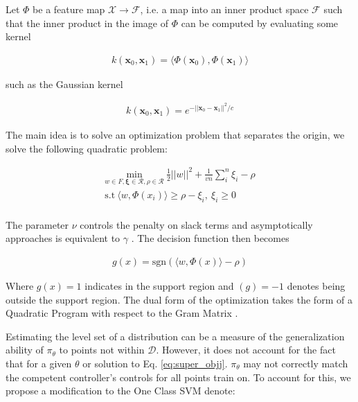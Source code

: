 \documentclass[10pt, conference]{ieeeconf}      %
\newcommand{\bx}{\mathbf{x}}
\newcommand{\mR}{\mathcal{R}}
\begin{document}
Let $\Phi$ be a feature map $\mathcal{X} \rightarrow \mathcal{F}$, i.e. a map into an inner product space $\mathcal{F}$ such that the inner product in the image of $\Phi$ can be computed by evaluating some  kernel

\vspace{-2ex}
\begin{align}
k(\bx_0,\bx_1) = \langle\Phi(\bx_0),\Phi(\bx_1)\rangle
\end{align}

such as the Gaussian kernel 

\vspace{-2ex}
\begin{align}
k(\bx_0,\bx_1) = e^{-||\bx_0 - \bx_1||^2/c}
\end{align}

The main idea is to solve an optimization problem that separates the origin, we solve the following quadratic problem:

\vspace{-2ex}
\begin{align}\label{eq:primal_sup}
\underset{w\in F, \mathbf{\xi} \in \mR, \rho \in \mR}{\mbox{min}}\: \frac{1}{2}||w||^2+\frac{1}{vn} \sum^n_i \xi_i - \rho\\
\mbox{s.t} \: \langle w,\Phi(x_i) \rangle \geq \rho - \xi_i, \: \xi_i \geq 0 \\
\end{align}

The parameter $\nu$ controls the penalty on slack terms and asymptotically approaches is equivalent to $\gamma$ \cite{vert2006consistency}.  The decision function then becomes 

\vspace{-2ex}
\begin{align}\label{eq:decision_func}
g(x) = \mbox{sgn}(\langle w,\Phi(x) \rangle-\rho)
\end{align}

Where $g(x) = 1$ indicates in the support region and $(g) = -1$ denotes being outside the support region. The dual form of the optimization takes the form of a Quadratic Program with respect to the Gram Matrix \cite{scholkopf2001estimating}. 

Estimating the level set of a distribution can be a measure of the generalization ability of $\pi_{\theta}$ to points not within $\mathcal{D}$. However, it does not account for the fact that for a given $\theta$ or  solution to Eq. \ref{eq:super_objj}. $\pi_\theta$ may not correctly match the competent controller's controls for all points train on. To account for this, we propose a modification to the One Class SVM denote: 
\end{document}
